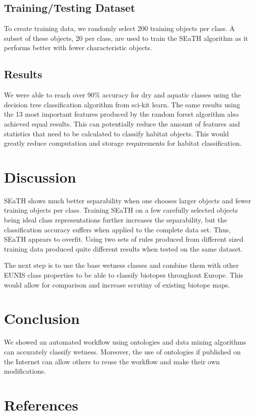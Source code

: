 \documentclass[authoryear, review,12pt,number]{elsarticle}
\begin{document}
\subsection{Training/Testing Dataset}
To create training data, we randomly select 200 training objects per class. A
subset of these objects, 20 per class, are used to train the SEaTH
algorithm as it performs better with fewer characteristic objects.
\subsection{Results}
We were able to reach over 90\% accuracy for dry and aquatic classes using the
decision tree classification algorithm from sci-kit learn. The same results
using the 13 most important features produced by the random forest algorithm
also achieved equal results. This can potentially reduce the amount of features
and statistics that need to be calculated to classify habitat objects. This
would greatly reduce computation and storage requirements for habitat
classification.
\section{Discussion}
SEaTH shows much better separability when one chooses larger objects and fewer
training objects per class. Training SEaTH on a few carefully selected objects
being ideal class representations further increases the separability, but the classification
accuracy suffers when applied to the complete data set. Thus, SEaTH appears to
overfit. Using two sets of rules produced from different sized training data
produced quite different results when tested on the same dataset.

The next step is to use the base wetness classes and combine them with other
EUNIS class properties to be able to classify biotopes throughout Europe. This
would allow for comparison and increase scrutiny of existing biotope maps.

\section{Conclusion}
We showed an automated workflow using ontologies and data mining algorithms can
accurately classify wetness. Moreover, the use of ontologies if published on the
Internet can allow others to reuse the workflow and make their own
modifications.

\section{References}

\end{document}
